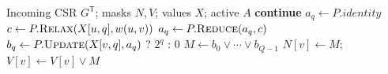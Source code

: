\begin{algorithm}[t]
  \caption{\coalescedgather: access-efficient destination aggregation}
  \label{alg:coalesced-gather}
  \footnotesize
  \begin{algorithmic}[1]
    \Require Incoming CSR $G^{\mathsf T}$; masks $N,V$; values $X$; active $A$
         \State \textbf{continue} \EndIf
        \State $a_q\gets P.\mathit{identity}$
          \State $c\gets P.\Call{Relax}{X[u,q],w(u,v)}$
          \State $a_q\gets P.\Call{Reduce}{a_q,c}$
        \EndFor
        \State $b_q\gets P.\Call{Update}{X[v,q],a_q}$ ? $2^q$ : $0$
      \EndFor
      \State $M\gets b_0\lor\cdots\lor b_{Q-1}$
      \State $N[v]\gets M$; $V[v]\gets V[v]\lor M$
    \EndFor
  \end{algorithmic}
\end{algorithm}
